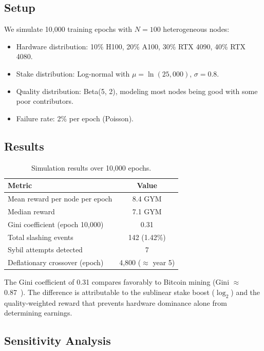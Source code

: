 \documentclass[11pt,letterpaper]{article}
\begin{document}
\subsection{Setup}

We simulate 10{,}000 training epochs with $N = 100$ heterogeneous nodes:

\begin{itemize}
    \item Hardware distribution: 10\% H100, 20\% A100, 30\% RTX 4090, 40\% RTX 4080.
    \item Stake distribution: Log-normal with $\mu = \ln(25{,}000)$, $\sigma = 0.8$.
    \item Quality distribution: Beta(5, 2), modeling most nodes being good with some poor contributors.
    \item Failure rate: 2\% per epoch (Poisson).
\end{itemize}

\subsection{Results}

\begin{table}[t]
\centering
\begin{tabular}{lc}
\toprule
\textbf{Metric} & \textbf{Value} \\
\midrule
Mean reward per node per epoch & 8.4 GYM \\
Median reward & 7.1 GYM \\
Gini coefficient (epoch 10{,}000) & 0.31 \\
Total slashing events & 142 (1.42\%) \\
Sybil attempts detected & 7 \\
Deflationary crossover (epoch) & 4{,}800 ($\approx$ year 5) \\
\bottomrule
\end{tabular}
\caption{Simulation results over 10{,}000 epochs.}
\label{tab:simulation}
\end{table}

The Gini coefficient of 0.31 compares favorably to Bitcoin mining (Gini $\approx$ 0.87~\cite{srinivasan2017quantifying}).  The difference is attributable to the sublinear stake boost ($\log_2$) and the quality-weighted reward that prevents hardware dominance alone from determining earnings.

\subsection{Sensitivity Analysis}
\end{document}
